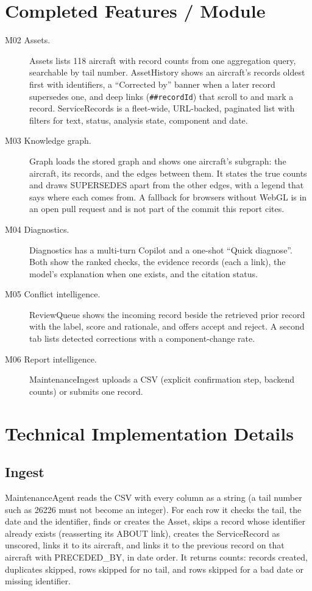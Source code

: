 \section{Completed Features / Module}

\begin{description}
\item[M02 Assets.] Assets lists 118 aircraft with record counts from one aggregation query, searchable by tail number. AssetHistory shows an aircraft's records oldest first with identifiers, a ``Corrected by'' banner when a later record supersedes one, and deep links (\texttt{\#\#recordId}) that scroll to and mark a record. ServiceRecords is a fleet-wide, URL-backed, paginated list with filters for text, status, analysis state, component and date.
\item[M03 Knowledge graph.] Graph loads the stored graph and shows one aircraft's subgraph: the aircraft, its records, and the edges between them. It states the true counts and draws SUPERSEDES apart from the other edges, with a legend that says where each comes from. A fallback for browsers without WebGL is in an open pull request and is not part of the commit this report cites.
\item[M04 Diagnostics.] Diagnostics has a multi-turn Copilot and a one-shot ``Quick diagnose''. Both show the ranked checks, the evidence records (each a link), the model's explanation when one exists, and the citation status.
\item[M05 Conflict intelligence.] ReviewQueue shows the incoming record beside the retrieved prior record with the label, score and rationale, and offers accept and reject. A second tab lists detected corrections with a component-change rate.
\item[M06 Report intelligence.] MaintenanceIngest uploads a CSV (explicit confirmation step, backend counts) or submits one record.
\end{description}

\section{Technical Implementation Details}

\subsection{Ingest}

MaintenanceAgent reads the CSV with every column as a string (a tail number such as 26226 must not become an integer). For each row it checks the tail, the date and the identifier, finds or creates the Asset, skips a record whose identifier already exists (reasserting its ABOUT link), creates the ServiceRecord as unscored, links it to its aircraft, and links it to the previous record on that aircraft with PRECEDED\_BY, in date order. It returns counts: records created, duplicates skipped, rows skipped for no tail, and rows skipped for a bad date or missing identifier.


